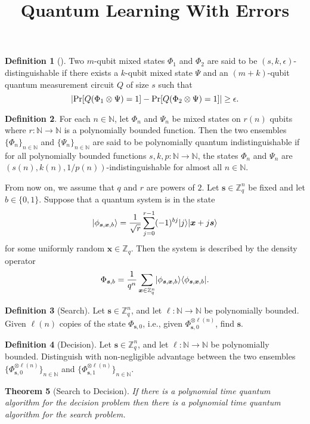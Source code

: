 \documentclass[11pt]{article}
\title{Quantum Learning With Errors}
\author{
}
\date{}
\theoremstyle{plain}
\newtheorem{theorem}{Theorem}
\theoremstyle{definition}
\newtheorem{definition}[theorem]{Definition}
\DeclarePairedDelimiter{\abs}{\lvert}{\rvert}
\DeclarePairedDelimiter{\ldbrac}{\lvert}{\rangle}
\DeclarePairedDelimiter{\rdbrac}{\langle}{\rvert}
\def\N{\ensuremath{\mathbb{N}}}
\def\Z{\ensuremath{\mathbb{Z}}}
\begin{document}
\maketitle



\begin{definition}[\cite{watrous2009zero}]
    Two $m$-qubit mixed states $\Phi_1$ and $\Phi_2$ are said to be $(s, k, \epsilon)$-distinguishable if there exists a $k$-qubit mixed state $\Psi$ and an $(m + k)$-qubit quantum measurement circuit $Q$ of size $s$ such that
    \[ \abs{ \Pr[Q(\Phi_1 \otimes \Psi) = 1] - \Pr[Q(\Phi_2 \otimes \Psi) = 1] } \ge \epsilon. \]
\end{definition}
\begin{definition}
    For each $n \in \N$, let $\Phi_n$ and $\Psi_n$ be mixed states on $r(n)$ qubits where $r: \N \rightarrow \N$ is a polynomially bounded function. Then the two ensembles $\{ \Phi_n \}_{n \in \N}$ and $\{ \Psi_n \}_{n \in \N}$ are said to be polynomially quantum indistinguishable if for all polynomially bounded functions $s, k, p: \N \rightarrow \N$, the states $\Phi_n$ and $\Psi_n$ are $(s(n), k(n), 1 / p(n))$-indistinguishable for almost all $n \in \N$.
\end{definition}
From now on, we assume that $q$ and $r$ are powers of $2$. Let $\bm{s} \in \Z_q^n$ be fixed and let $b \in \{ 0, 1 \}$. Suppose that a quantum system is in the state 
\[ \ldbrac{\phi_{\bm{s}, \bm{x}, b}} = \frac{1}{\sqrt{r}} \sum_{j = 0}^{r - 1} (-1)^{bj}\ldbrac{j}\ldbrac{\bm{x} + j\bm{s}} \]
for some uniformly random $\bm{x} \in \Z_q$. Then the  system is described by the density operator  
\[ \Phi_{\bm{s}, b} = \frac{1}{q^n} \sum_{\bm{x} \in \Z_q^n} \ldbrac{\phi_{\bm{s}, \bm{x}, b}} \rdbrac{\phi_{\bm{s}, \bm{x}, b}}. \]
\begin{definition}[Search]
    Let $\bm{s} \in \Z_q^n$, and let $\ell: \N \rightarrow \N$ be polynomially bounded. Given $\ell(n)$ copies of the state $\Phi_{\bm{s}, 0}$, i.e., given $\Phi_{\bm{s}, 0}^{\otimes \ell(n)}$, find $\bm{s}$.
\end{definition}
\begin{definition}[Decision]
    Let $\bm{s} \in \Z_q^n$, and let $\ell: \N \rightarrow \N$ be polynomially bounded. Distinguish with non-negligible advantage between the two ensembles $\{ \Phi_{\bm{s}, 0}^{\otimes \ell(n)} \}_{n \in \N}$ and $\{ \Phi_{\bm{s}, 1}^{\otimes \ell(n)} \}_{n \in \N}$.
\end{definition}
\begin{theorem}[Search to Decision]
    If there is a polynomial time quantum algorithm for the decision problem then there is a polynomial time quantum algorithm for the search problem.
\end{theorem}
\end{document}
